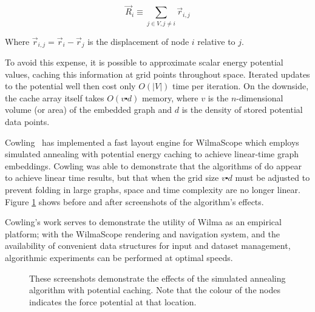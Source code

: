 \documentclass[runningheads]{cl2emult}
\begin{document}
\begin{equation}
\label{repulsion}
\vec{R}_i \equiv \sum_{j \in V, j \neq i} \vec{r}_{i,j}
\end{equation}

\noindent Where $\vec{r}_{i,j} = \vec{r}_i - \vec{r}_j$ is the displacement
of node $i$ relative to $j$.

To avoid this expense, it is possible to approximate scalar energy potential
values, caching this information at grid points throughout space.  Iterated
updates to the potential well then cost only $O(|V|)$ time per iteration.  On
the downside, the cache array itself takes $O(v \centerdot d)$ memory, where
$v$ is the $n$-dimensional volume (or area) of the embedded graph and $d$ is
the density of stored potential data points.

Cowling~\cite{cowling02fast} has implemented a fast layout engine for
WilmaScope which employs simulated annealing with potential energy caching
to achieve linear-time graph embeddings.  Cowling was able to demonstrate
that the algorithms of \cite{davidson01noise} do appear to achieve linear
time results, but that when the grid size $v \centerdot d$ must be adjusted to
prevent folding in large graphs, space and time complexity are
no longer linear.  Figure \ref{fig-fastlayout} shows before and after
screenshots of the algorithm's effects.

Cowling's work serves to demonstrate the utility of Wilma as an empirical
platform; with the WilmaScope rendering and navigation system, and the
availability of convenient data structures for input and dataset management,
algorithmic experiments can be performed at optimal speeds.

\begin{figure}[h]
  \centering
  \caption{These screenshots demonstrate the effects of the simulated
  annealing algorithm with potential caching.  Note that the colour of
  the nodes indicates the force potential at that location.}
  \label{fig-fastlayout}
\end{figure}
\end{document}
